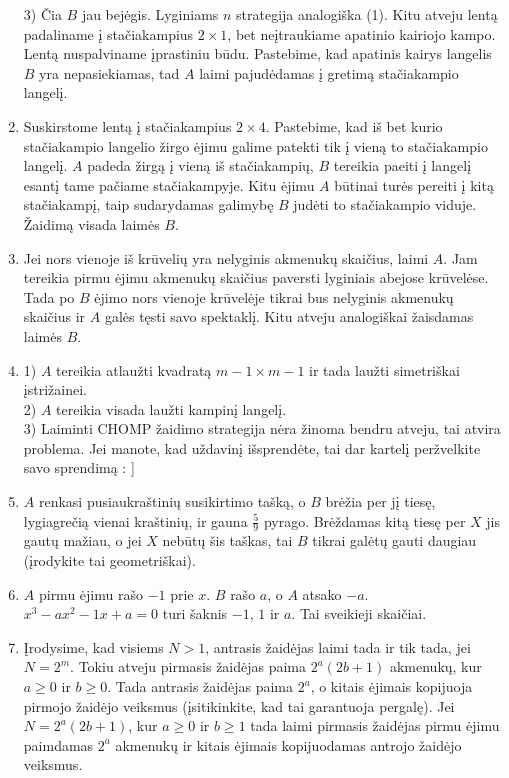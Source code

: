 \begin{enumerate}
3) Čia $B$ jau bejėgis. Lyginiams $n$ strategija analogiška (1). Kitu
atveju lentą padaliname į stačiakampius $2\times 1$, bet neįtraukiame
apatinio kairiojo kampo. Lentą nuspalviname įprastiniu būdu. Pastebime,
kad apatinis kairys langelis $B$ yra nepasiekiamas, tad $A$ laimi
pajudėdamas į gretimą stačiakampio langelį.
\item 
Suskirstome lentą į stačiakampius  $2\times 4$. Pastebime, kad iš bet
kurio stačiakampio langelio žirgo ėjimu galime patekti tik į vieną to
stačiakampio langelį. $A$ padeda žirgą į vieną iš stačiakampių, $B$ tereikia
paeiti į langelį esantį tame pačiame stačiakampyje. Kitu ėjimu $A$ būtinai
turės pereiti į kitą stačiakampį, taip sudarydamas galimybę $B$ judėti to
stačiakampio viduje. Žaidimą visada laimės $B$.
\item 
 Jei nors vienoje iš krūvelių yra nelyginis akmenukų skaičius, laimi $A$.
 Jam tereikia pirmu ėjimu akmenukų skaičius paversti lyginiais abejose
 krūvelėse. Tada po $B$ ėjimo nors vienoje krūvelėje tikrai bus nelyginis
 akmenukų skaičius ir $A$ galės tęsti savo spektaklį. Kitu atveju
 analogiškai žaisdamas laimės $B$. 
\item 
1) $A$ tereikia atlaužti kvadratą $ m-1\times m-1 $ ir tada laužti
simetriškai įstrižainei.\\
2) $A$ tereikia visada laužti kampinį langelį.\\
3) Laiminti CHOMP žaidimo strategija nėra žinoma bendru atveju, tai atvira
problema. Jei manote, kad uždavinį išsprendėte, tai dar kartelį
peržvelkite savo sprendimą : ] 
\item 
$A$ renkasi pusiaukraštinių susikirtimo tašką, o $B$ brėžia per jį tiesę,
lygiagrečią vienai kraštinių, ir gauna $\frac{5}{9}$ pyrago. Brėždamas kitą
tiesę per $X$ jis gautų mažiau, o jei $X$ nebūtų šis taškas, tai $B$ tikrai
galėtų gauti daugiau (įrodykite tai geometriškai). 
\item 
$A$ pirmu ėjimu rašo $-1$ prie $x$. $B$ rašo $a$, o $A$ atsako $-a$. $x^3-a x^2-1
x+a=0$ turi šaknis $-1$, $1$ ir $a$. Tai sveikieji skaičiai.
\item 
Įrodysime, kad visiems $N>1$, antrasis žaidėjas laimi tada ir tik tada,
jei $N=2^m$. Tokiu atveju pirmasis žaidėjas paima $2^a(2b+1)$ akmenukų,
kur $a\geq 0$ ir $b\geq 0$. Tada antrasis žaidėjas paima $2^a$, o kitais
ėjimais kopijuoja pirmojo žaidėjo veiksmus (įsitikinkite, kad tai
garantuoja pergalę). Jei $N=2^a(2b+1)$, kur $a\geq 0$ ir $b\geq 1$ tada
laimi pirmasis žaidėjas pirmu ėjimu paimdamas $2^a$ akmenukų ir kitais
ėjimais kopijuodamas antrojo žaidėjo veiksmus.

\end{enumerate}
